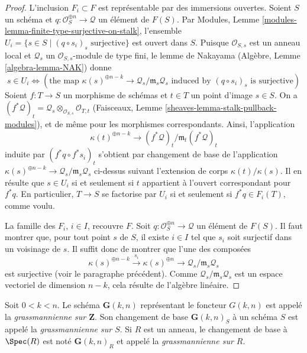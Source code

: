 \begin{proof}
\medskip\noindent
L'inclusion $F_i \subset F$ est représentable par des immersions ouvertes.
Soient $S$ un schéma et $q : \mathcal{O}_S^{\oplus n} \to \mathcal{Q}$
un élément de $F(S)$. Par Modules,
Lemme \ref{modules-lemma-finite-type-surjective-on-stalk}, l'ensemble
$U_i = \{s \in S \mid (q \circ s_i)_s\text{ surjective}\}$ est ouvert
dans $S$. Puisque $\mathcal{O}_{S, s}$ est un anneau local et
$\mathcal{Q}_s$ un $\mathcal{O}_{S, s}$-module de type fini, le lemme de
Nakayama (Algèbre, Lemme \ref{algebra-lemma-NAK}) donne
$$
s \in U_i \Leftrightarrow
\left(
\text{the map }
\kappa(s)^{\oplus n - k} \to \mathcal{Q}_s/\mathfrak m_s\mathcal{Q}_s
\text{ induced by }
(q \circ s_i)_s
\text{ is surjective}
\right)
$$
Soient $f : T \to S$ un morphisme de schémas et $t \in T$ un point
d'image $s \in S$. On a
$(f^*\mathcal{Q})_t =
\mathcal{Q}_s \otimes_{\mathcal{O}_{S, s}} \mathcal{O}_{T, t}$
(Faisceaux, Lemme \ref{sheaves-lemma-stalk-pullback-modules}), et de même
pour les morphismes correspondants. Ainsi, l'application
$$
\kappa(t)^{\oplus n - k} \to (f^*\mathcal{Q})_t/\mathfrak m_t(f^*\mathcal{Q})_t
$$
induite par $(f^*q \circ f^*s_i)_t$ s'obtient par changement de base de
l'application
$\kappa(s)^{\oplus n - k} \to \mathcal{Q}_s/\mathfrak m_s\mathcal{Q}_s$
ci-dessus suivant l'extension de corps $\kappa(t)/\kappa(s)$.
Il en résulte que $s \in U_i$ si et seulement si $t$ appartient à l'ouvert
correspondant pour $f^*q$. En particulier, $T \to S$ se factorise par
$U_i$ si et seulement si $f^*q \in F_i(T)$, comme voulu.

\medskip\noindent
La famille des $F_i$, $i \in I$, recouvre $F$.
Soit $q : \mathcal{O}_S^{\oplus n} \to \mathcal{Q}$ un élément de $F(S)$.
Il faut montrer que, pour tout point $s$ de $S$, il existe $i \in I$ tel
que $s_i$ soit surjectif dans un voisinage de $s$.
Il suffit donc de montrer que l'une des composées
$$
\kappa(s)^{\oplus n - k} \xrightarrow{s_i}
\kappa(s)^{\oplus n} \rightarrow
\mathcal{Q}_s/\mathfrak m_s\mathcal{Q}_s
$$
est surjective (voir le paragraphe précédent). Comme
$\mathcal{Q}_s/\mathfrak m_s\mathcal{Q}_s$ est un espace vectoriel de
dimension $n - k$, cela résulte de l'algèbre linéaire.
\end{proof}

\begin{definition}
\label{definition-grassmannian}
Soit $0 < k < n$. Le schéma $\mathbf{G}(k, n)$ représentant le foncteur
$G(k, n)$ est appelé la {\it grassmannienne sur $\mathbf{Z}$}.
Son changement de base $\mathbf{G}(k, n)_S$ à un schéma $S$ est appelé la
{\it grassmannienne sur $S$}. Si $R$ est un anneau, le changement de base
à $\Spec(R)$ est noté $\mathbf{G}(k, n)_R$ et appelé la
{\it grassmannienne sur $R$}.
\end{definition}

